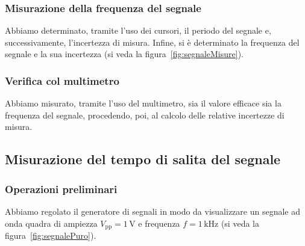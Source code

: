 \documentclass{article}
\begin{document}
			\subsubsection{Misurazione della frequenza del segnale}
				Abbiamo determinato, tramite l'uso dei cursori, il periodo del segnale e, successivamente, l'incertezza di misura. Infine, si è determinato la frequenza del segnale e la sua incertezza (si veda la figura~\ref{fig:segnaleMisure}).
			\subsubsection{Verifica col multimetro}
				Abbiamo misurato, tramite l'uso del multimetro, sia il valore efficace sia la frequenza del segnale, procedendo, poi, al calcolo delle relative incertezze di misura.
		\subsection{Misurazione del tempo di salita del segnale}
			\subsubsection{Operazioni preliminari}
				Abbiamo regolato il generatore di segnali in modo da visualizzare un segnale ad onda quadra di ampiezza $ V_{\mathrm{pp}} = 1 \, \mathrm{V} $ e frequenza $ f = 1 \, \mathrm{kHz} $ (si veda la figura~\ref{fig:segnalePuro}).
\end{document}
